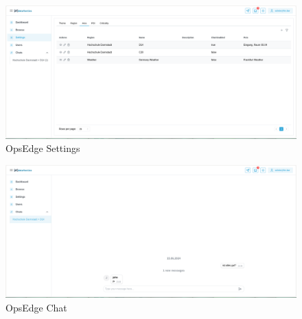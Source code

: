 \begin{figure}[h]
    \centering
    \includegraphics[width=1\textwidth]{gfx/opsedge-settings.png}
    \caption{OpsEdge Settings}
    \label{fig:opsedge_settings}
\end{figure}

\begin{figure}[h]
    \centering
    \includegraphics[width=1\textwidth]{gfx/opsedge-chat.png}
    \caption{OpsEdge Chat}
    \label{fig:opsedge_chat}
\end{figure}